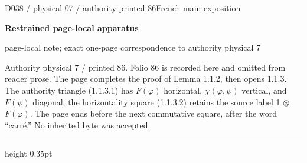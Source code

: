 \documentclass[9pt]{article}
\newcommand{\CanonText}[1]{\par{\fontsize{8.0}{9.35}\selectfont\RaggedRight #1\par}\vspace{2.2pt}}
\newcommand{\LayerTitle}{Restrained page-local apparatus}
\begin{document}
\noindent\begin{minipage}[t][\dimexpr\textheight-5pt\relax][t]{\textwidth}
{\sffamily\fontsize{7.3}{8.2}\selectfont\color{Quiet} D038 / physical 07 / authority printed 86\hfill French main exposition}
\par{}\vspace{4.5pt}
{\sffamily\fontsize{10.4}{11.6}\selectfont\bfseries\color{Accent} \LayerTitle}
\par{\sffamily\fontsize{6.7}{7.7}\selectfont\color{Quiet} page-local note; exact one-page correspondence to authority physical 7}
\vspace{5pt}
\CanonText{Authority physical 7 / printed 86. Folio 86 is recorded here and omitted from reader prose. The page completes the proof of Lemma 1.1.2, then opens 1.1.3. The authority triangle (1.1.3.1) has \(F(\varphi{})\) horizontal, \(\chi{}(\varphi{},\psi{})\) vertical, and \(F(\psi{})\) diagonal; the horizontality square (1.1.3.2) retains the source label 1 \(\otimes{}\) \(F(\varphi{})\). The page ends before the next commutative square, after the word “carré.” No inherited byte was accepted.}
\vfill
{\color{Accent}\hrule height 0.35pt}\vspace{3pt}
\end{minipage}
\newpage
\end{document}
